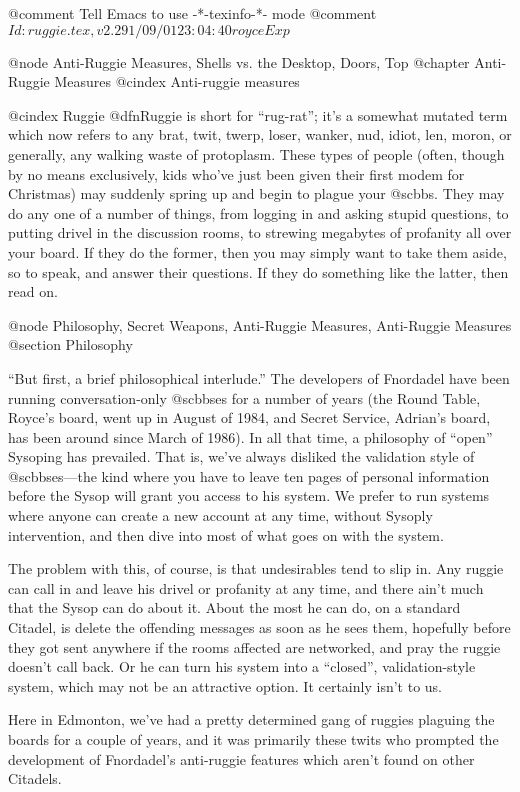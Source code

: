 @comment Tell Emacs to use -*-texinfo-*- mode
@comment $Id: ruggie.tex,v 2.2 91/09/01 23:04:40 royce Exp $

@node Anti-Ruggie Measures, Shells vs. the Desktop, Doors, Top
@chapter Anti-Ruggie Measures
@cindex Anti-ruggie measures

@cindex Ruggie
@dfn{Ruggie} is short for ``rug-rat''; it's a somewhat mutated term
which now refers to any brat, twit, twerp, loser, wanker, nud, idiot, len,
moron, or generally, any walking waste of protoplasm.  These types of
people (often, though by no means exclusively, kids who've
just been given their first modem for Christmas) may suddenly spring up
and begin to plague your @sc{bbs}.  They may do any one of a number of things,
from logging in and asking stupid questions, to putting drivel in the
discussion rooms, to strewing megabytes of profanity all over your board.
If they do the former, then you may simply want to take them aside, so to
speak, and answer their questions.  If they do something like the latter,
then read on.

@node Philosophy, Secret Weapons, Anti-Ruggie Measures, Anti-Ruggie Measures
@section Philosophy

``But first, a brief philosophical interlude.''  The developers
of Fnordadel have been running conversation-only @sc{bbs}es for a
number of years (the Round Table, Royce's board, went up in
August of 1984, and Secret Service, Adrian's board, has been around
since March of 1986).  In all that time, a philosophy of ``open''
Sysoping has prevailed.  That is, we've always disliked the
validation style of @sc{bbs}es---the kind where you have to leave
ten pages of personal information before the Sysop will grant
you access to his system.  We prefer to run systems where
anyone can create a new account at any time, without Sysoply
intervention, and then dive into most of what goes on with the system.

The problem with this, of course, is that undesirables
tend to slip in.  Any ruggie can call in and leave his drivel
or profanity at any time, and there ain't much that the Sysop
can do about it.  About the most he can do, on a standard
Citadel, is delete the offending messages as soon as he sees
them, hopefully before they got sent anywhere if the rooms affected
are networked, and pray the ruggie doesn't call back.  Or he can turn
his system into a ``closed'', validation-style system, which may
not be an attractive option.  It certainly isn't to us.

Here in Edmonton, we've had a pretty determined gang
of ruggies plaguing the boards for a couple of years, and it
was primarily these twits who prompted the development of
Fnordadel's anti-ruggie features which aren't found on other
Citadels.

